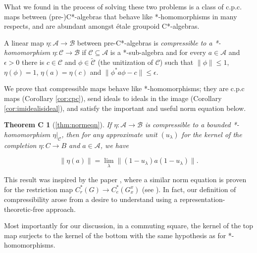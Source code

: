 \documentclass[a4paper, 12pt]{amsart}
\newtheorem*{thmC}{Theorem C}
\theoremstyle{definition}
\theoremstyle{remark}
\numberwithin{equation}{section}
\begin{document}
What we found in the process of solving these two problems is a class of c.p.c. maps between (pre-)C*-algebras that behave like *-homomorphisms in many respects, and are abundant amongst \'etale groupoid C*-algebras.

A linear map $\eta:\mathcal{A}\to \mathcal{B}$ between pre-C*-algebras is \emph{compressible to a *-homomorphism} $\eta:\mathcal{C}\to \mathcal{B}$ if $\mathcal{C}\subseteq \mathcal{A}$ is a *-sub-algebra and for every $a\in\mathcal{A}$ and $\epsilon > 0$ there is $c\in\mathcal{C}$ and $\phi\in \tilde{\mathcal{C}}$ (the unitization of $\mathcal{C}$) such that $\|\phi\|\leq 1$, $\eta(\phi) = 1$, $\eta(a) = \eta(c)$ and $\|\phi^{*}a\phi - c\|\leq \epsilon $.

We prove that compressible maps behave like *-homomorphisms; they are c.p.c maps (Corollary \ref{cor:cpc}), send ideals to ideals in the image (Corollary \ref{cor:imidealisideal}), and satisfy the important and useful norm equation below.

\begin{thmC}[\ref{thm:normeqn}]

If $\eta:\mathcal{A}\to\mathcal{B}$ is compressible to a bounded *-homomorphism $\eta|_{\mathcal{C}}$, then for any approximate unit $(u_{\lambda})$ for the kernel of the completion $\eta: C\to B$ and $a\in\mathcal{A}$, we have

\begin{equation*}
    \|\eta(a)\| = \lim_{\lambda}\|(1-u_{\lambda})a(1-u_{\lambda})\|.
\end{equation*}

\end{thmC}

This result was inspired by the paper \cite{CN22}, where a similar norm equation is proven for the restriction map $C_{r}^{*}(G)\to C_{e}^{*}(G^{x}_{x})$ (see \cite[Equation~2.3]{CN22}). In fact, our definition of compressibility arose from a desire to understand \cite{CN22} using a representation-theoretic-free approach.

Most importantly for our discussion, in a commuting square, the kernel of the top map surjects to the kernel of the bottom with the same hypothesis as for *-homomorphisms.
\end{document}
